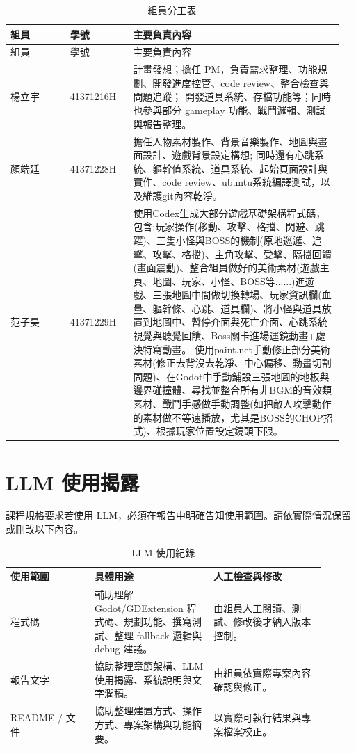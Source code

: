 \documentclass[12pt,a4paper]{article}
\begin{document}
\begin{longtable}{p{0.17\linewidth}p{0.18\linewidth}p{0.60\linewidth}}
\caption{組員分工表}\\
\toprule
組員 & 學號 & 主要負責內容 \\
\midrule
\endfirsthead
\toprule
組員 & 學號 & 主要負責內容 \\
\midrule
\endhead
楊立宇 & 41371216H & 計畫發想；擔任 PM，負責需求整理、功能規劃、開發進度控管、code review、整合檢查與問題追蹤； 開發道具系統、存檔功能等；同時也參與部分 gameplay 功能、戰鬥邏輯、測試與報告整理。 \\
顏端廷 & 41371228H & 擔任人物素材製作、背景音樂製作、地圖與畫面設計、遊戲背景設定構想; 同時還有心跳系統、軀幹值系統、道具系統、起始頁面設計與實作、code review、ubuntu系統編譯測試，以及維護git內容乾淨。 \\
范子昊 & 41371229H & 使用Codex生成大部分遊戲基礎架構程式碼，包含:玩家操作(移動、攻擊、格擋、閃避、跳躍)、三隻小怪與BOSS的機制(原地巡邏、追擊、攻擊、格擋)、主角攻擊、受擊、隔擋回饋(畫面震動)、整合組員做好的美術素材(遊戲主頁、地圖、玩家、小怪、BOSS等......)進遊戲、三張地圖中間做切換轉場、玩家資訊欄(血量、軀幹條、心跳、道具欄)、將小怪與道具放置到地圖中、暫停介面與死亡介面、心跳系統視覺與聽覺回饋、Boss關卡進場運鏡動畫+處決特寫動畫。
使用paint.net手動修正部分美術素材(修正去背沒去乾淨、中心偏移、動畫切割問題)、在Godot中手動鋪設三張地圖的地板與邊界碰撞體、尋找並整合所有非BGM的音效類素材、戰鬥手感做手動調整(如把敵人攻擊動作的素材做不等速播放，尤其是BOSS的CHOP招式)、根據玩家位置設定鏡頭下限。\\
\bottomrule
\end{longtable}

\section{LLM 使用揭露}

課程規格要求若使用 LLM，必須在報告中明確告知使用範圍。請依實際情況保留或刪改以下內容。

\begin{table}[H]
\centering
\caption{LLM 使用紀錄}
\begin{tabular}{p{0.24\linewidth}p{0.34\linewidth}p{0.32\linewidth}}
\toprule
使用範圍 & 具體用途 & 人工檢查與修改 \\
\midrule
程式碼 & 輔助理解 Godot/GDExtension 程式碼、規劃功能、撰寫測試、整理 fallback 邏輯與 debug 建議。 & 由組員人工閱讀、測試、修改後才納入版本控制。 \\
報告文字 & 協助整理章節架構、LLM 使用揭露、系統說明與文字潤稿。 & 由組員依實際專案內容確認與修正。 \\
README / 文件 & 協助整理建置方式、操作方式、專案架構與功能摘要。 & 以實際可執行結果與專案檔案校正。 \\
\bottomrule
\end{tabular}
\end{table}
\end{document}
